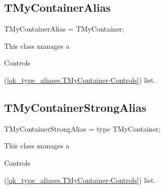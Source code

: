 \documentclass{report}
\begin{document}
\subsection*{TMyContainerAlias}
\begin{list}{}{
\setlength{\itemindent}{0cm}
\setlength{\listparindent}{0cm}
\setlength{\leftmargin}{\evensidemargin}
\addtolength{\leftmargin}{\tmplength}
\settowidth{\labelsep}{X}
\addtolength{\leftmargin}{\labelsep}
\setlength{\labelwidth}{\tmplength}
}
\begin{flushleft}
\item[\textbf{Declaration}\hfill]
\begin{ttfamily}
TMyContainerAlias = TMyContainer;\end{ttfamily}


\end{flushleft}
\par
\item[\textbf{Description}]
This class manages a \begin{ttfamily}Controls\end{ttfamily}(\ref{ok_type_aliases.TMyContainer-Controls}) list.

\end{list}
\subsection*{TMyContainerStrongAlias}
\begin{list}{}{
\setlength{\itemindent}{0cm}
\setlength{\listparindent}{0cm}
\setlength{\leftmargin}{\evensidemargin}
\addtolength{\leftmargin}{\tmplength}
\settowidth{\labelsep}{X}
\addtolength{\leftmargin}{\labelsep}
\setlength{\labelwidth}{\tmplength}
}
\begin{flushleft}
\item[\textbf{Declaration}\hfill]
\begin{ttfamily}
TMyContainerStrongAlias = type TMyContainer;\end{ttfamily}


\end{flushleft}
\par
\item[\textbf{Description}]
This class manages a \begin{ttfamily}Controls\end{ttfamily}(\ref{ok_type_aliases.TMyContainer-Controls}) list.

\end{list}
\end{document}
